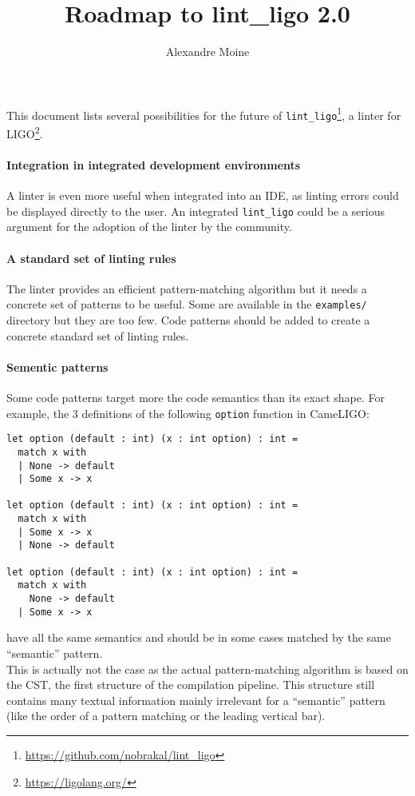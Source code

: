 \documentclass[10pt,a4paper]{article}
\author{Alexandre Moine}
\title{Roadmap to lint\_ligo 2.0}
\begin{document}
\maketitle

This document lists several possibilities for the future of \verb|lint_ligo|\footnote{\url{https://github.com/nobrakal/lint_ligo}}, a linter for LIGO\footnote{\url{https://ligolang.org/}}.

\paragraph{Integration in integrated development environments}
A linter is even more useful when integrated into an IDE, as linting errors could be displayed directly to the user.
An integrated \verb|lint_ligo| could be a serious argument for the adoption of the linter by the community.

\paragraph{A standard set of linting rules}

The linter provides an efficient pattern-matching algorithm but it needs a concrete set of patterns to be useful. Some are available in the \verb|examples/| directory but they are too few. Code patterns should be added to create a concrete standard set of linting rules.

\paragraph{Sementic patterns}
Some code patterns target more the code semantics than its exact shape. For example, the 3 definitions of the following \verb|option| function in CameLIGO:
\begin{verbatim}
let option (default : int) (x : int option) : int =
  match x with
  | None -> default
  | Some x -> x

let option (default : int) (x : int option) : int =
  match x with
  | Some x -> x
  | None -> default

let option (default : int) (x : int option) : int =
  match x with
    None -> default
  | Some x -> x
\end{verbatim}

have all the same semantics and should be in some cases matched by the same ``semantic'' pattern.\\
This is actually not the case as the actual pattern-matching algorithm is based on the CST, the first structure of the compilation pipeline. This structure still contains many textual information mainly irrelevant for a ``semantic'' pattern (like the order of a pattern matching or the leading vertical bar).
\end{document}
